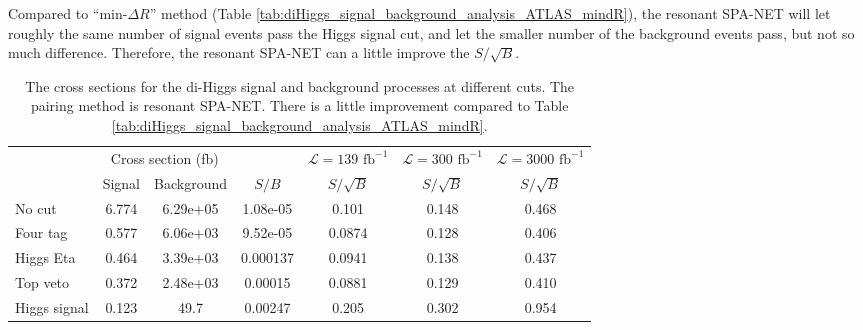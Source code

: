 \documentclass[12pt]{article}
\begin{document}
		Compared to ``$\text{min-}\Delta R$'' method (Table \ref{tab:diHiggs_signal_background_analysis_ATLAS_mindR}), the resonant SPA-NET will let roughly the same number of signal events pass the Higgs signal cut, and let the smaller number of the background events pass, but not so much difference. Therefore, the resonant SPA-NET can a little improve the $S/\sqrt{B}$.

		\begin{table}[htpb]
			\centering
			\caption{The cross sections for the di-Higgs signal and background processes at different cuts. The pairing method is resonant SPA-NET. There is a little improvement compared to Table \ref{tab:diHiggs_signal_background_analysis_ATLAS_mindR}.}
			\label{tab:diHiggs_signal_background_analysis_ATLAS_resonant_SPANET}
			\begin{tabular}{l|cc|c|c|c|c}
							 & \multicolumn{2}{c|}{Cross section (fb)} &          & $\mathcal{L} = 139 \text{ fb}^{-1}$ & $\mathcal{L} = 300 \text{ fb}^{-1}$ & $\mathcal{L} = 3000 \text{ fb}^{-1}$ \\
							 & Signal           & Background           & $S / B$  & $S/\sqrt{B}$                        & $S/\sqrt{B}$                        & $S/\sqrt{B}$                         \\ \hline
				No cut       & 6.774 & 6.29e+05 & 1.08e-05 & 0.101  & 0.148 & 0.468 \\
				Four tag     & 0.577 & 6.06e+03 & 9.52e-05 & 0.0874 & 0.128 & 0.406 \\
				Higgs Eta    & 0.464 & 3.39e+03 & 0.000137 & 0.0941 & 0.138 & 0.437 \\
				Top veto     & 0.372 & 2.48e+03 & 0.00015  & 0.0881 & 0.129 & 0.410 \\
				Higgs signal & 0.123 & 49.7     & 0.00247  & 0.205  & 0.302 & 0.954	
			\end{tabular}
		\end{table}

\end{document}
